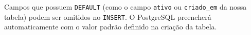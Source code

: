 \begin{tcolorbox}[colback=blue!5,colframe=blue!40!black,title=Dica do Professor: Omissions]
Campos que possuem \texttt{DEFAULT} (como o campo \texttt{ativo} ou \texttt{criado\_em} da nossa tabela) podem ser omitidos no \texttt{INSERT}. O PostgreSQL preencherá automaticamente com o valor padrão definido na criação da tabela.
\end{tcolorbox}

\vspace{0.5cm}
\begin{center}

\end{center}




